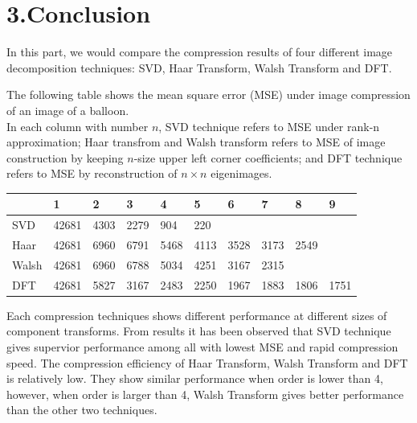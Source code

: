 \documentclass[12pt]{article}
\begin{document}
\section*{3.\quad Conclusion}
In this part, we would compare the compression results of four different image decomposition techniques: 
SVD, Haar Transform, Walsh Transform and DFT.
\begin{flushleft}
    The following table shows the mean square error (MSE) under image compression of an image of a balloon. \\
    In each column with number $n$, 
    SVD technique refers to MSE under rank-n approximation; 
    Haar transfrom and Walsh transform refers to MSE of image construction by keeping $n$-size upper left corner coefficients;
    and DFT technique refers to MSE by reconstruction of $n\times n$ eigenimages.

    \begin{table}[H]
        \centering
        \begin{tabular}{llllllllll}
            \toprule
            & 1 & 2 & 3 & 4 & 5 & 6 & 7 & 8 & 9 \\
            \midrule
            SVD & 42681 & 4303 & 2279 & 904 & 220 &  &  &  &  \\
            Haar & 42681 & 6960 & 6791 & 5468 & 4113 & 3528 & 3173 & 2549 &  \\
            Walsh & 42681 & 6960 & 6788 & 5034 & 4251 & 3167 & 2315 &  &  \\
            DFT & 42681 & 5827 & 3167 & 2483 & 2250 & 1967 & 1883 & 1806 & 1751 \\
            \bottomrule
        \end{tabular}
    \end{table}

    Each compression techniques shows different performance at different sizes of component transforms. 
    From results it has been observed that SVD technique gives supervior performance among all with lowest MSE and rapid compression speed. 
    The compression efficiency of Haar Transform, Walsh Transform and DFT is relatively low. 
    They show similar performance when order is lower than 4, however, when order is larger than 4, 
    Walsh Transform gives better performance than the other two techniques. 

\end{flushleft}
\end{document}
